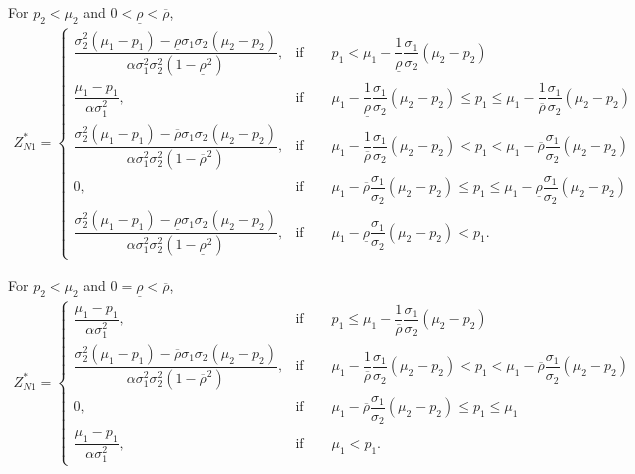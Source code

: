 \documentclass[10pt]{article}
\begin{document}
For $ p_2 < \mu_2 $ and $ 0 < \underline{\rho} < \overline{\rho} $,
{\footnotesize \begin{eqnarray}
Z_{N 1}^* = \left\{ \begin{matrix}
\dfrac{\sigma_2^2 (\mu_1 - p_1) - \underline{\rho} \sigma_1 \sigma_2 (\mu_2 - p_2)}{\alpha \sigma_1^2 \sigma_2^2 (1 - \underline{\rho}^2)}, & \text{if} \qquad p_1 < \mu_1 - \dfrac1{\underline{\rho}} \dfrac{\sigma_1}{\sigma_2} (\mu_2 - p_2) \\
\dfrac{\mu_1 - p_1}{\alpha \sigma_1^2}, & \text{if} \qquad \mu_1 - \dfrac1{\underline{\rho}} \dfrac{\sigma_1}{\sigma_2} (\mu_2 - p_2) \leqslant p_1 \leqslant \mu_1 - \dfrac1{\overline{\rho}} \dfrac{\sigma_1}{\sigma_2} (\mu_2 - p_2) \\
\dfrac{\sigma_2^2 (\mu_1 - p_1) - \overline{\rho} \sigma_1 \sigma_2 (\mu_2 - p_2)}{\alpha \sigma_1^2 \sigma_2^2 (1 - \overline{\rho}^2)}, & \text{if} \qquad \mu_1 - \dfrac1{\overline{\rho}} \dfrac{\sigma_1}{\sigma_2} (\mu_2 - p_2) < p_1 < \mu_1 - \overline{\rho} \dfrac{\sigma_1}{\sigma_2} (\mu_2 - p_2) \\
0, & \text{if} \qquad \mu_1 - \overline{\rho} \dfrac{\sigma_1}{\sigma_2} (\mu_2 - p_2) \leqslant p_1 \leqslant \mu_1 - \underline{\rho} \dfrac{\sigma_1}{\sigma_2} (\mu_2 - p_2) \\
\dfrac{\sigma_2^2 (\mu_1 - p_1) - \underline{\rho} \sigma_1 \sigma_2 (\mu_2 - p_2)}{\alpha \sigma_1^2 \sigma_2^2 (1 - \underline{\rho}^2)}, & \text{if} \qquad \mu_1 - \underline{\rho} \dfrac{\sigma_1}{\sigma_2} (\mu_2 - p_2) < p_1.
\end{matrix} \right.
\end{eqnarray}}

For $ p_2 < \mu_2 $ and $ 0 = \underline{\rho} < \overline{\rho} $,
{\footnotesize \begin{eqnarray}
Z_{N 1}^* = \left\{ \begin{matrix}
\dfrac{\mu_1 - p_1}{\alpha \sigma_1^2}, & \text{if} \qquad p_1 \leqslant \mu_1 - \dfrac1{\overline{\rho}} \dfrac{\sigma_1}{\sigma_2} (\mu_2 - p_2) \\
\dfrac{\sigma_2^2 (\mu_1 - p_1) - \overline{\rho} \sigma_1 \sigma_2 (\mu_2 - p_2)}{\alpha \sigma_1^2 \sigma_2^2 (1 - \overline{\rho}^2)}, & \text{if} \qquad \mu_1 - \dfrac1{\overline{\rho}} \dfrac{\sigma_1}{\sigma_2} (\mu_2 - p_2) < p_1 < \mu_1 - \overline{\rho} \dfrac{\sigma_1}{\sigma_2} (\mu_2 - p_2) \\
0, & \text{if} \qquad \mu_1 - \overline{\rho} \dfrac{\sigma_1}{\sigma_2} (\mu_2 - p_2) \leqslant p_1 \leqslant \mu_1 \\
\dfrac{\mu_1 - p_1}{\alpha \sigma_1^2}, & \text{if} \qquad \mu_1 < p_1.
\end{matrix} \right.
\end{eqnarray}}
\end{document}
